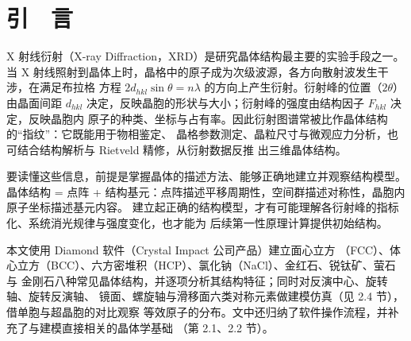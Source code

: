 \section{引　言}

X 射线衍射（X-ray Diffraction，XRD）是研究晶体结构最主要的实验手段之一\cite{liang1991xray}。
当 X 射线照射到晶体上时，晶格中的原子成为次级波源，各方向散射波发生干涉，在满足布拉格
方程 $2d_{hkl}\sin\theta=n\lambda$ 的方向上产生衍射。衍射峰的位置（$2\theta$）由晶面间距
$d_{hkl}$ 决定，反映晶胞的形状与大小；衍射峰的强度由结构因子 $F_{hkl}$ 决定，反映晶胞内
原子的种类、坐标与占有率。因此衍射图谱常被比作晶体结构的``指纹''：它既能用于物相鉴定、
晶格参数测定、晶粒尺寸与微观应力分析，也可结合结构解析与 Rietveld 精修，从衍射数据反推
出三维晶体结构。

要读懂这些信息，前提是掌握晶体的描述方法、能够正确地建立并观察结构模型。晶体结构 =
点阵 + 结构基元：点阵描述平移周期性，空间群描述对称性，晶胞内原子坐标描述基元内容。
建立起正确的结构模型，才有可能理解各衍射峰的指标化、系统消光规律与强度变化，也才能为
后续第一性原理计算提供初始结构\cite{huang1988solid}。

本文使用 Diamond 软件（Crystal Impact 公司产品\cite{diamond2023manual}）建立面心立方
（FCC）、体心立方（BCC）、六方密堆积（HCP）、氯化钠（NaCl）、金红石、锐钛矿、萤石与
金刚石八种常见晶体结构，并逐项分析其结构特征；同时对反演中心、旋转轴、旋转反演轴、
镜面、螺旋轴与滑移面六类对称元素做建模仿真（见 2.4 节），借单胞与超晶胞的对比观察
等效原子的分布。文中还归纳了软件操作流程，并补充了与建模直接相关的晶体学基础
（第 2.1、2.2 节）。
